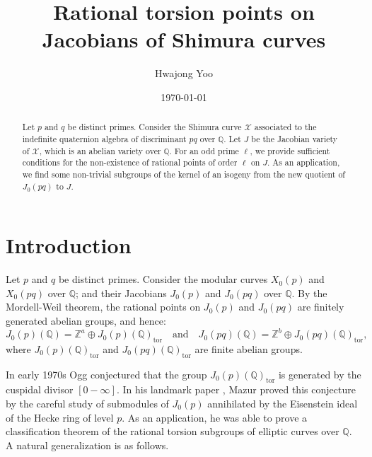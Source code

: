 \documentclass[a4paper, 12pt]{amsart}
\theoremstyle{definition}
\theoremstyle{remark}
\numberwithin{equation}{section} \numberwithin{table}{section}
\begin{document}
                                                                          

\title{Rational torsion points on Jacobians of Shimura curves}
\author{Hwajong Yoo}
\address{Universit\'e du Luxembourg, Facult\'e des Sciences, de la Technologie et de la Communication, 6, rue Richard Coudenhove-Kalergi, L-1359 Luxembourg, Luxembourg}

\date{\today}

\begin{abstract}
Let $p$ and $q$ be distinct primes. Consider the Shimura curve ${{\mathcal{X}}}$ associated to the indefinite quaternion algebra of discriminant $pq$ over ${{\mathbb{Q}}}$. Let $J$ be the Jacobian variety of ${{\mathcal{X}}}$, which is an abelian variety over ${{\mathbb{Q}}}$. For an odd prime $\ell$, we provide sufficient conditions for the non-existence of rational points of order $\ell$ on $J$. As an application, we find some non-trivial subgroups of the kernel of an isogeny from the new quotient of $J_0(pq)$ to $J$.
\end{abstract} 
\maketitle
\setcounter{tocdepth}{1}
\tableofcontents

\section{Introduction}
Let $p$ and $q$ be distinct primes. Consider the modular curves $X_0(p)$ and $X_0(pq)$ over ${{\mathbb{Q}}}$; and their Jacobians $J_0(p)$ and $J_0(pq)$ over ${{\mathbb{Q}}}$. By the Mordell-Weil theorem, the rational points on $J_0(p)$ and $J_0(pq)$ are finitely generated abelian groups, and hence:
$$
J_0(p)({{\mathbb{Q}}})={{\mathbb{Z}}}^a \oplus J_0(p)({{\mathbb{Q}}})_{{\mathrm{tor}}}\quad\text{and}\quad J_0(pq)({{\mathbb{Q}}})={{\mathbb{Z}}}^b \oplus J_0(pq)({{\mathbb{Q}}})_{{\mathrm{tor}}},
$$
where $J_0(p)({{\mathbb{Q}}})_{{\mathrm{tor}}}$ and $J_0(pq)({{\mathbb{Q}}})_{{\mathrm{tor}}}$ are finite abelian groups. 

In early 1970s Ogg \cite{Og75} conjectured that the group $J_0(p)({{\mathbb{Q}}})_{{\mathrm{tor}}}$ is generated by the cuspidal divisor $[0-\infty]$. In his landmark paper \cite{M77}, Mazur proved this conjecture by the careful study of submodules of $J_0(p)$ annihilated by the Eisenstein ideal of the Hecke ring of level $p$. As an application, he was able to prove a classification theorem of the rational torsion subgroups of elliptic curves over ${{\mathbb{Q}}}$. 
A natural generalization is as follows.
\end{document}
